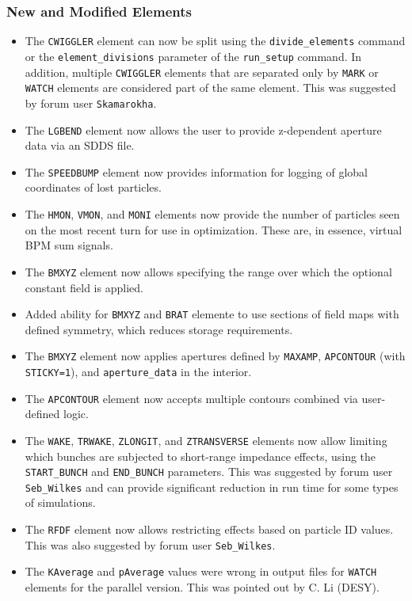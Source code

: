 \documentclass[11pt]{article}
\begin{document}
\subsubsection{New and Modified Elements}
\begin{itemize}
\item The \verb|CWIGGLER| element can now be split using the \verb|divide_elements| command or
  the \verb|element_divisions| parameter of the \verb|run_setup| command. In addition, multiple \verb|CWIGGLER| elements
  that are separated only by \verb|MARK| or \verb|WATCH| elements are considered part of the same element.
  This was suggested by forum user \verb|Skamarokha|.
\item The \verb|LGBEND| element now allows the user to provide z-dependent aperture data via an SDDS file.
\item The \verb|SPEEDBUMP| element now provides information for logging of global coordinates of lost particles.
\item The \verb|HMON|, \verb|VMON|, and \verb|MONI| elements now provide the number of particles seen on the
  most recent turn for use in optimization. These are, in essence, virtual BPM sum signals.
\item The \verb|BMXYZ| element now allows specifying the range over which the optional constant field is applied.
\item Added ability for \verb|BMXYZ| and \verb|BRAT| elemente to use sections of field maps with defined symmetry,
  which reduces storage requirements.
\item The \verb|BMXYZ| element now applies apertures defined by \verb|MAXAMP|, \verb|APCONTOUR| (with
  \verb|STICKY=1|), and \verb|aperture_data| in the interior.
\item The \verb|APCONTOUR| element now accepts multiple contours combined via user-defined logic.
\item The \verb|WAKE|, \verb|TRWAKE|, \verb|ZLONGIT|, and \verb|ZTRANSVERSE| elements now allow limiting
  which bunches are subjected to short-range impedance effects, using the \verb|START_BUNCH| and \verb|END_BUNCH|
  parameters. This was suggested by forum user \verb|Seb_Wilkes| and can provide significant reduction in run
  time for some types of simulations.
\item The \verb|RFDF| element now allows restricting effects based on particle ID values. This was also
  suggested by forum user \verb|Seb_Wilkes|.
\item The \verb|KAverage| and \verb|pAverage| values were wrong in output files for \verb|WATCH| elements
  for the parallel version. This was pointed out by C. Li (DESY).
\end{itemize}
\end{document}
